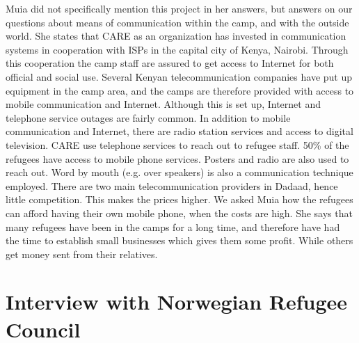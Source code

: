 Muia did not specifically mention this project in her answers, but answers on our questions about means of communication within the camp, and with the outside world. She states that CARE as an organization has invested in communication systems in cooperation with ISPs in the capital city of Kenya, Nairobi. Through this cooperation the camp staff are assured to get access to Internet for both official and social use. Several Kenyan telecommunication companies have put up equipment in the camp area, and the camps are therefore provided with access to mobile communication and Internet. Although this is set up, Internet and telephone service outages are fairly common. In addition to mobile communication and Internet, there are radio station services and access to digital television. CARE use telephone services to reach out to refugee staff. 50\% of the refugees have access to mobile phone services. Posters and radio are also used to reach out. Word by mouth (e.g. over speakers) is also a communication technique employed. There are two main telecommunication providers in Dadaad, hence little competition. This makes the prices higher. We asked Muia how the refugees can afford having their own mobile phone, when the costs are high. She says that many refugees have been in the camps for a long time, and therefore have had the time to establish small businesses which gives them some profit. While others get money sent from their relatives. 


\section{Interview with Norwegian Refugee Council}

